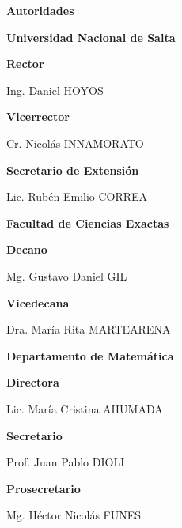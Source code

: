 \begin{center}
	\LARGE \bfseries \sffamily Autoridades
\end{center}

\begin{center}
	\sffamily \Large \bfseries Universidad Nacional de Salta

	\bigskip
	
	\sffamily \large \bfseries Rector
	
	\normalfont \large
	Ing. Daniel HOYOS
	
	\bigskip
	
	\sffamily \large \bfseries Vicerrector
	
	\normalfont \large
	Cr. Nicolás INNAMORATO
	
	\bigskip
	
	\sffamily \large \bfseries Secretario de Extensión 
	
	\normalfont \large
	Lic. Rubén Emilio CORREA
\end{center}

\vspace*{5mm}

\begin{center}
	\sffamily \Large \bfseries Facultad de Ciencias Exactas
	
	\bigskip
	
	\sffamily \large \bfseries Decano
	
	\normalfont \large
	Mg. Gustavo Daniel GIL
	
	\bigskip
	
	\sffamily \large \bfseries Vicedecana
	
	\normalfont \large
	Dra. María Rita MARTEARENA
\end{center}

\vspace*{5mm}

\begin{center}
	\sffamily \Large \bfseries Departamento de Matemática
	
	\bigskip
	
	\sffamily \large \bfseries Directora
	
	\normalfont \large
	Lic. María Cristina AHUMADA
	
	\bigskip
	
	\sffamily \large \bfseries Secretario
	
	\normalfont \large
	Prof. Juan Pablo DIOLI
	
	\bigskip
	
	\sffamily \large \bfseries Prosecretario
	
	\normalfont \large
	Mg. Héctor Nicolás FUNES
\end{center}